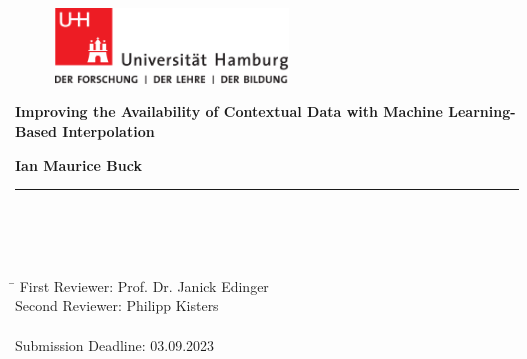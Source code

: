 \begin{titlepage}
	
	\setcounter{page}{-1}
	
	\begin{figure}[h]
		\begin{minipage}[b]{62mm}
			\includegraphics[width=62mm]{images/unilogo}
		\end{minipage}
		\hspace{4cm}
	\end{figure}
	
	\vfill
	
	\begin{center}
		\vspace{14mm}
		\noindent \textbf{\huge
			Improving the Availability of Contextual Data with Machine Learning-Based Interpolation
		}
		\vspace{60mm}	
	\end{center}
	
	\vfill
	
	\noindent \textbf{Ian Maurice Buck} \\
	\noindent \rule{\textwidth}{0.4mm} 
	 \\
	 \\
	 \\
	\begin{tabbing}
		\hspace{8em} \=  \kill
		First Reviewer: \> Prof. Dr. Janick Edinger \\
		Second Reviewer: \> Philipp Kisters \\
		~ \\
		Submission Deadline: 03.09.2023
	\end{tabbing}
	
	\newpage 
	\thispagestyle{empty}
	\setcounter{page}{0}
	

\end{titlepage}
